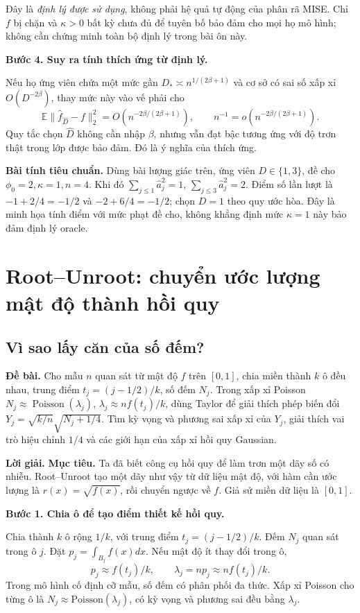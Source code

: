 \documentclass[11pt,a4paper]{article}
\newcommand{\E}{\mathbb E}
\newcommand{\buoc}[1]{\par\medskip\textbf{#1}\par}
\begin{document}
Đây là \emph{định lý được sử dụng}, không phải hệ quả tự động của phân rã MISE. Chỉ $f$ bị chặn và $\kappa>0$ bất kỳ chưa đủ để tuyên bố bảo đảm cho mọi họ mô hình; không cần chứng minh toàn bộ định lý trong bài ôn này.
\buoc{Bước 4. Suy ra tính thích ứng từ định lý.}
Nếu họ ứng viên chứa một mức gần $D_*\asymp n^{1/(2\beta+1)}$ và cơ sở có sai số xấp xỉ $O(D^{-2\beta})$, thay mức này vào vế phải cho
\[
\E\|\widehat f_{\widehat D}-f\|_2^2=O(n^{-2\beta/(2\beta+1)}),
\qquad n^{-1}=o(n^{-2\beta/(2\beta+1)}).
\]
Quy tắc chọn $\widehat D$ không cần nhập $\beta$, nhưng vẫn đạt bậc tương ứng với độ trơn thật trong lớp được bảo đảm. Đó là ý nghĩa của thích ứng.

\textbf{Bài tính tiêu chuẩn.} Dùng bài lượng giác trên, ứng viên $D\in\{1,3\}$, đề cho $\phi_0=2,\kappa=1,n=4$. Khi đó $\sum_{j\leq1}\widehat a_j^2=1$, $\sum_{j\leq3}\widehat a_j^2=2$. Điểm số lần lượt là $-1+2/4=-1/2$ và $-2+6/4=-1/2$; chọn $D=1$ theo quy ước hòa. Đây là minh họa tính điểm với mức phạt đề cho, không khẳng định mức $\kappa=1$ này bảo đảm định lý oracle.


\section{Root--Unroot: chuyển ước lượng mật độ thành hồi quy}\label{sec:root}
\subsection{Vì sao lấy căn của số đếm?}
\textbf{Đề bài.} Cho mẫu $n$ quan sát từ mật độ $f$ trên $[0,1]$,
chia miền thành $k$ ô đều nhau, trung điểm $t_j=(j-1/2)/k$, số đếm $N_j$.
Trong xấp xỉ Poisson $N_j\approx\operatorname{Poisson}(\lambda_j)$,
$\lambda_j\approx nf(t_j)/k$, dùng Taylor để giải thích phép biến đổi
$Y_j=\sqrt{k/n}\sqrt{N_j+1/4}$.
Tìm kỳ vọng và phương sai xấp xỉ của $Y_j$, giải thích vai trò hiệu chỉnh $1/4$
và các giới hạn của xấp xỉ hồi quy Gaussian.

\textbf{Lời giải.}
\textbf{Mục tiêu.} Ta đã biết công cụ hồi quy để làm trơn một dãy số có nhiễu. Root--Unroot tạo một dãy như vậy từ dữ liệu mật độ, với hàm cần ước lượng là $r(x)=\sqrt{f(x)}$, rồi chuyển ngược về $f$. Giả sử miền dữ liệu là $[0,1]$.

\buoc{Bước 1. Chia ô để tạo điểm thiết kế hồi quy.}
Chia thành $k$ ô rộng $1/k$, với trung điểm $t_j=(j-1/2)/k$. Đếm $N_j$ quan sát trong ô $j$. Đặt $p_j=\int_{B_j}f(x)dx$. Nếu mật độ ít thay đổi trong ô,
\[
p_j\approx f(t_j)/k,\qquad \lambda_j=np_j\approx nf(t_j)/k.
\]
Trong mô hình cố định cỡ mẫu, số đếm có phân phối đa thức. Xấp xỉ Poisson cho từng ô là
$N_j\approx\mathrm{Poisson}(\lambda_j)$, có kỳ vọng và phương sai đều bằng $\lambda_j$.
\end{document}
